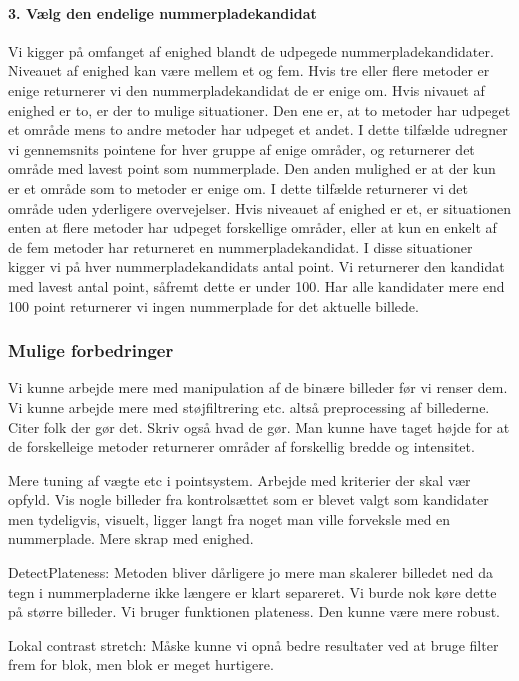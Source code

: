 \paragraph{3. Vælg den endelige nummerpladekandidat}
Vi kigger på omfanget af enighed blandt de udpegede nummerpladekandidater. Niveauet af enighed kan være mellem et og fem. Hvis tre eller flere metoder er enige returnerer vi den nummerpladekandidat de er enige om. Hvis nivauet af enighed er to, er der to mulige situationer. Den ene er, at to metoder har udpeget et område mens to andre metoder har udpeget et andet. I dette tilfælde udregner vi gennemsnits pointene for hver gruppe af enige områder, og returnerer det område med lavest point som nummerplade. Den anden mulighed er at der kun er et område som to metoder er enige om. I dette tilfælde returnerer vi det område uden yderligere overvejelser. Hvis niveauet af enighed er et, er situationen enten at flere metoder har udpeget forskellige områder, eller at kun en enkelt af de fem metoder har returneret en nummerpladekandidat. I disse situationer kigger vi på hver nummerpladekandidats antal point. Vi returnerer den kandidat med lavest antal point, såfremt dette er under 100. Har alle kandidater mere end 100 point returnerer vi ingen nummerplade for det aktuelle billede.

\subsubsection{Mulige forbedringer}
Vi kunne arbejde mere med manipulation af de binære billeder før vi renser dem. Vi kunne arbejde mere med støjfiltrering etc. altså preprocessing af billederne. Citer folk der gør det. Skriv også hvad de gør.
Man kunne have taget højde for at de forskelleige metoder returnerer områder af forskellig bredde og intensitet.

Mere tuning af vægte etc i pointsystem. Arbejde med kriterier der skal vær opfyld. Vis nogle billeder fra kontrolsættet som er blevet valgt som kandidater men tydeligvis, visuelt, ligger langt fra noget man ville forveksle med en nummerplade. Mere skrap med enighed.


DetectPlateness:
Metoden bliver dårligere jo mere man skalerer billedet ned da tegn i nummerpladerne ikke længere er klart separeret. Vi burde nok køre dette på større billeder.
Vi bruger funktionen plateness. Den kunne være mere robust.

Lokal contrast stretch:
Måske kunne vi opnå bedre resultater ved at bruge filter frem for blok, men blok er meget hurtigere.

